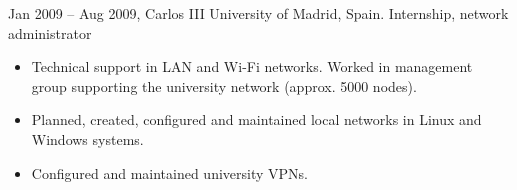 \experience
  {Jan 2009 – Aug 2009, Carlos III University of Madrid, Spain.}
  {Internship, network administrator}
  {\vspace{-1em}\begin{itemize}
    \itemsep3pt \parskip0pt 
    \item Technical support in LAN and Wi-Fi networks. Worked in management
    group supporting the university network (approx. 5000 nodes).
    \item Planned, created, configured and maintained local networks in Linux
    and Windows systems.
    \item Configured and maintained university VPNs.
  \end{itemize}}
